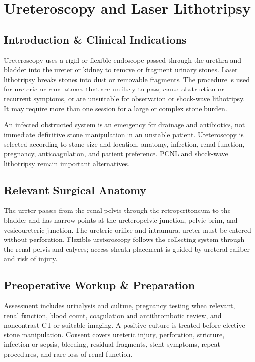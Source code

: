\chapter{Ureteroscopy and Laser Lithotripsy}

\section*{Introduction \& Clinical Indications}
Ureteroscopy uses a rigid or flexible endoscope passed through the urethra and bladder into the ureter or kidney to remove or fragment urinary stones. Laser lithotripsy breaks stones into dust or removable fragments. The procedure is used for ureteric or renal stones that are unlikely to pass, cause obstruction or recurrent symptoms, or are unsuitable for observation or shock-wave lithotripsy. It may require more than one session for a large or complex stone burden.

An infected obstructed system is an emergency for drainage and antibiotics, not immediate definitive stone manipulation in an unstable patient. Ureteroscopy is selected according to stone size and location, anatomy, infection, renal function, pregnancy, anticoagulation, and patient preference. PCNL and shock-wave lithotripsy remain important alternatives.

\section*{Relevant Surgical Anatomy}
The ureter passes from the renal pelvis through the retroperitoneum to the bladder and has narrow points at the ureteropelvic junction, pelvic brim, and vesicoureteric junction. The ureteric orifice and intramural ureter must be entered without perforation. Flexible ureteroscopy follows the collecting system through the renal pelvis and calyces; access sheath placement is guided by ureteral caliber and risk of injury.

\section*{Preoperative Workup \& Preparation}
Assessment includes urinalysis and culture, pregnancy testing when relevant, renal function, blood count, coagulation and antithrombotic review, and noncontrast CT or suitable imaging. A positive culture is treated before elective stone manipulation. Consent covers ureteric injury, perforation, stricture, infection or sepsis, bleeding, residual fragments, stent symptoms, repeat procedures, and rare loss of renal function.


